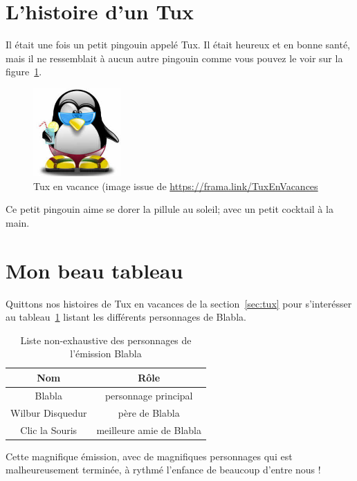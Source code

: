 \documentclass[a4paper, 12pt]{article}
\begin{document}
\section{L'histoire d'un Tux \label{sec:tux}}
Il était une fois un petit pingouin appelé Tux.  Il était heureux et en bonne santé, mais il ne ressemblait à aucun autre pingouin comme vous pouvez le voir sur la figure~\ref{fig:tux}. 
\begin{figure}
\centering
\includegraphics[width=0.3\textwidth]{tux.jpeg}
\caption{Tux en vacance (image issue de \url{https://frama.link/TuxEnVacances}}
\label{fig:tux}
\end{figure}
Ce petit pingouin aime se dorer la pillule au soleil; avec un petit cocktail à la main. 

\section{Mon beau tableau}
Quittons nos histoires de Tux en vacances de la section~\ref{sec:tux} pour s'interésser au tableau~\ref{tab:Blabla} listant les différents personnages de Blabla.
\begin{table}
\centering
\begin{tabular}{|c||c|}
\hline
Nom & Rôle \\
\hline
\hline
Blabla & personnage principal \\
\hline
Wilbur Disquedur & père de Blabla \\
\hline
Clic la Souris & meilleure amie de Blabla\\
\hline
\end{tabular}
\caption{Liste non-exhaustive des personnages de l'émission Blabla}
\label{tab:Blabla}
\end{table}

Cette magnifique émission, avec de magnifiques personnages qui est malheureusement terminée, à rythmé l'enfance de beaucoup d'entre nous !
\end{document}
